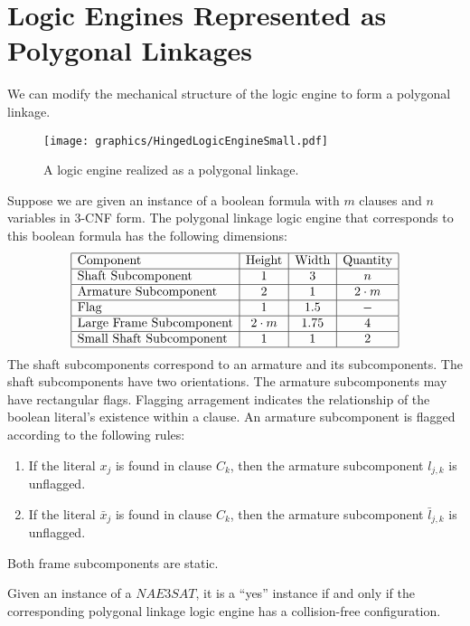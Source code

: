\section{Logic Engines Represented as Polygonal Linkages}   
We can modify the mechanical structure of the logic engine to form a polygonal linkage.  

\begin{figure}[!htbp]
\begin{center}
\texttt{[image: graphics/HingedLogicEngineSmall.pdf]}
\caption{A logic engine realized as a polygonal linkage.}\label{fig:HingedLogicEngineSmall.pdf}
\end{center}
\end{figure}
Suppose we are given an instance of a boolean formula with $m$ clauses and $n$ variables in 3-CNF form.  
The polygonal linkage logic engine that corresponds to this boolean formula has the following 
dimensions:
$$\begin{array}{|l|c|c|c|}%
 \hline
 \text{Component} & \text{Height} & \text{Width} & \text{Quantity}\\\hline
 \text{Shaft Subcomponent} & 1 & 3 & n\\\hline
 \text{Armature Subcomponent} & 2 & 1 & 2\cdot m\\\hline
 \text{Flag} & 1 & 1.5 & -\\\hline
 \text{Large Frame Subcomponent} & 2\cdot m & 1.75 & 4\\\hline
 \text{Small Shaft Subcomponent} & 1 & 1 & 2\\\hline
\end{array}$$
The shaft subcomponents correspond to an armature and its subcomponents. The shaft subcomponents 
have two orientations.  The armature subcomponents may have rectangular flags. Flagging arragement 
indicates the relationship of the boolean literal's existence within a clause.   An armature 
subcomponent is flagged according to the following rules:
\begin{enumerate}
 \item If the literal $x_j$ is found in clause $C_k$, then the armature subcomponent $l_{j,k}$ is 
unflagged.
 \item If the literal $\bar{x}_j$ is found in clause $C_k$, then the armature 
subcomponent $\bar{l}_{j,k}$ is unflagged.
\end{enumerate}
Both frame subcomponents are static.  
\begin{thm}\label{thm:Satisfiability-1}
 Given an instance of a $NAE3SAT$,  it is a ``yes'' instance if and only if the 
corresponding polygonal linkage logic engine has a collision-free configuration.  
\end{thm}

